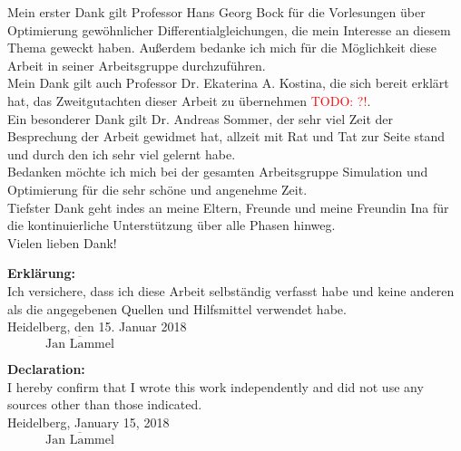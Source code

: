 \documentclass{scrartcl}[12pt, halfparskip]
\numberwithin{equation}{section}
\numberwithin{figure}{section}
\numberwithin{table}{section}
\newcommand{\todo}[1]{\textcolor{red}{TODO: #1}}
\begin{document}
\newpage
{}

Mein erster Dank gilt Professor Hans Georg Bock für die Vorlesungen über Optimierung gewöhnlicher Differentialgleichungen, die mein Interesse an diesem Thema geweckt haben. Außerdem bedanke ich mich für die Möglichkeit diese Arbeit in seiner Arbeitsgruppe durchzuführen. \\

Mein Dank gilt auch Professor Dr. Ekaterina A. Kostina, die sich bereit erklärt hat, das Zweitgutachten dieser Arbeit zu übernehmen \todo{?!}. \\ 

Ein besonderer Dank gilt Dr. Andreas Sommer, der sehr viel Zeit der Besprechung der Arbeit gewidmet hat, allzeit mit Rat und Tat zur Seite stand und durch den ich sehr viel gelernt habe.\\

Bedanken möchte ich mich bei der gesamten Arbeitsgruppe Simulation und Optimierung für die sehr schöne und angenehme Zeit. \\

 

Tiefster Dank geht indes an meine Eltern, Freunde und meine Freundin Ina für die kontinuierliche Unterstützung über alle Phasen hinweg. \\

Vielen lieben Dank!


\newpage
\textbf{Erklärung:} \\[3ex]
Ich versichere, dass ich diese Arbeit selbständig verfasst habe und keine anderen als die angegebenen Quellen und Hilfsmittel verwendet habe.\\[2ex]

Heidelberg, den 15. Januar 2018 \\[6ex]

$\overline{\qquad \quad \text{Jan Lammel} \quad \qquad}$


\vspace{5cm}

\textbf{Declaration:} \\[3ex]
I hereby confirm that I wrote this work independently and did not use any sources other than those indicated.\\[2ex]

Heidelberg, January 15, 2018 \\[6ex]

$\overline{\qquad \quad \text{Jan Lammel} \quad \qquad}$
\end{document}
